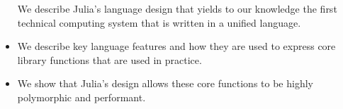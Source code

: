 \begin{itemize}
\begi We describe Julia's language design that yields to our knowledge the first technical computing system that is written in a unified language. 
\item We describe key language features and how they are used to express core library functions that are used in practice. 
\item We show that Julia's design allows these core functions to be highly polymorphic and performant.
\end{itemize}

%



